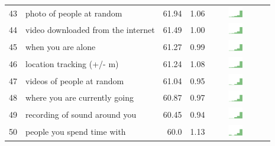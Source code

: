 \begin{table}[t]
\begin{center}
\begin{tabular}{| r | l | r | r | r | r |}
43 & photo of people at random & 61.94 & 1.06 & \includegraphics[width = 2cm, height = 0.5cm]{tex-inputs/table-images/tookphotosofpeople(withanoutward-facingcamera)atrandomcombined} \\ 
44 & video downloaded from the internet & 61.49 & 1.00 & \includegraphics[width = 2cm, height = 0.5cm]{tex-inputs/table-images/sharedvideosyoudownloadedontheinternetsavedonyourdevicecombined} \\ 
45 & when you are alone & 61.27 & 0.99 & \includegraphics[width = 2cm, height = 0.5cm]{tex-inputs/table-images/learnedwhenandhowmuchyouspendtimealonecombined} \\ 
46 & location tracking (+/- m) & 61.24 & 1.08 & \includegraphics[width = 2cm, height = 0.5cm]{tex-inputs/table-images/trackedwhereyouare(likeaGPS)combined} \\ 
47 & videos of people at random & 61.04 & 0.95 &  \includegraphics[width = 2cm, height = 0.5cm]{tex-inputs/table-images/tookvideosofpeople(withanoutward-facingcamera)atrandomcombined} \\ 
48 & where you are currently going & 60.87 & 0.97 &  \includegraphics[width = 2cm, height = 0.5cm]{tex-inputs/table-images/learnedwhereyouarecurrentlygoingcombined} \\ 
49 & recording of sound around you & 60.45 & 0.94 & \includegraphics[width = 2cm, height = 0.5cm]{tex-inputs/table-images/recordedthesoundaroundyoucombined} \\ 
50 & people you spend time with & 60.0 & 1.13 &  \includegraphics[width = 2cm, height = 0.5cm]{tex-inputs/table-images/learnedwhoyouwerespendingtimewithcombined} \\ 

\end{tabular}
\end{center}
\end{table}
